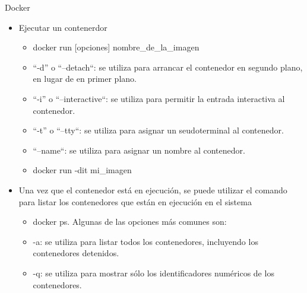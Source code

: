 \documentclass[aspectratio=169,11pt]{beamer}
\begin{document}
\begin{frame}[allowframebreaks]{Docker}
\small
  \begin{itemize}
  \item  Ejecutar un contenerdor
  \begin{itemize}
  \item docker run [opciones] nombre\_de\_la\_imagen
  \item ``-d'' o ``--detach``: se utiliza para arrancar el contenedor en segundo plano, en lugar de en primer plano.
  \item ``-i'' o ``--interactive``: se utiliza para permitir la entrada interactiva al contenedor.
  \item ``-t'' o ``--tty``: se utiliza para asignar un seudoterminal al contenedor.
  \item ``--name``: se utiliza para asignar un nombre al contenedor.
  \item docker run -dit mi\_imagen
  \end{itemize}
  \item Una vez que el contenedor está en ejecución, se puede utilizar el comando para listar los contenedores que están en ejecución en el sistema
    \begin{itemize}
  \item docker ps. Algunas de las opciones más comunes son:
  \item -a: se utiliza para listar todos los contenedores, incluyendo los contenedores detenidos.
  \item -q: se utiliza para mostrar sólo los identificadores numéricos de los contenedores.
   \end{itemize}

 
  \end{itemize}
\end{frame}
\end{document}
